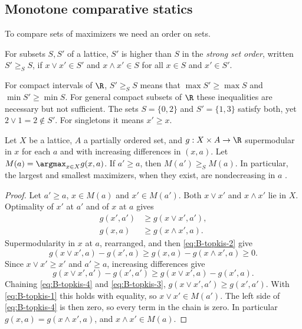 \subsection{Monotone comparative statics}\label{sec:B-topkis}

To compare sets of maximizers we need an order on sets.

\begin{definition}\label{def:B-sso}
For subsets $S, S'$ of a lattice, $S'$ is higher than $S$ in the \emph{strong set order}, written $S' \geq_S S$, if
$x \vee x' \in S'$ and $x \wedge x' \in S$ for all $x \in S$ and $x' \in S'$.
\end{definition}

For compact intervals of $\R$, $S' \geq_S S$ means that $\max S' \geq \max S$ and $\min S' \geq \min S$. For general
compact subsets of $\R$ these inequalities are necessary but not sufficient. The sets $S = \{0, 2\}$ and $S' = \{1, 3\}$
satisfy both, yet $2 \vee 1 = 2 \notin S'$. For singletons it means $x' \geq x$.

\begin{theorem}[Topkis]\label{thm:B-topkis}
Let $X$ be a lattice, $A$ a partially ordered set, and $g : X \times A \to \R$ supermodular in $x$ for each $a$ and with
increasing differences in $(x, a)$. Let $M(a) = \argmax_{x \in X}g(x, a)$. If $a' \geq a$, then $M(a') \geq_S M(a)$. In
particular, the largest and smallest maximizers, when they exist, are nondecreasing in $a$ \citep{Topkis1978}.
\end{theorem}

\begin{proof}
Let $a' \geq a$, $x \in M(a)$ and $x' \in M(a')$. Both $x \vee x'$ and $x \wedge x'$ lie in $X$. Optimality of $x'$ at $a'$
and of $x$ at $a$ gives
\begin{align}
  g(x', a') &\geq g(x \vee x', a'), \label{eq:B-topkis-1}\\
  g(x, a) &\geq g(x \wedge x', a). \label{eq:B-topkis-2}
\end{align}
Supermodularity in $x$ at $a$, rearranged, and then \eqref{eq:B-topkis-2} give
\begin{equation}\label{eq:B-topkis-3}
  g(x \vee x', a) - g(x', a) \geq g(x, a) - g(x \wedge x', a) \geq 0.
\end{equation}
Since $x \vee x' \geq x'$ and $a' \geq a$, increasing differences give
\begin{equation}\label{eq:B-topkis-4}
  g(x \vee x', a') - g(x', a') \geq g(x \vee x', a) - g(x', a).
\end{equation}
Chaining \eqref{eq:B-topkis-4} and \eqref{eq:B-topkis-3}, $g(x \vee x', a') \geq g(x', a')$. With
\eqref{eq:B-topkis-1} this holds with equality, so $x \vee x' \in M(a')$. The left side of \eqref{eq:B-topkis-4} is
then zero, so every term in the chain is zero. In particular $g(x, a) = g(x \wedge x', a)$, and $x \wedge x' \in M(a)$.
\end{proof}

